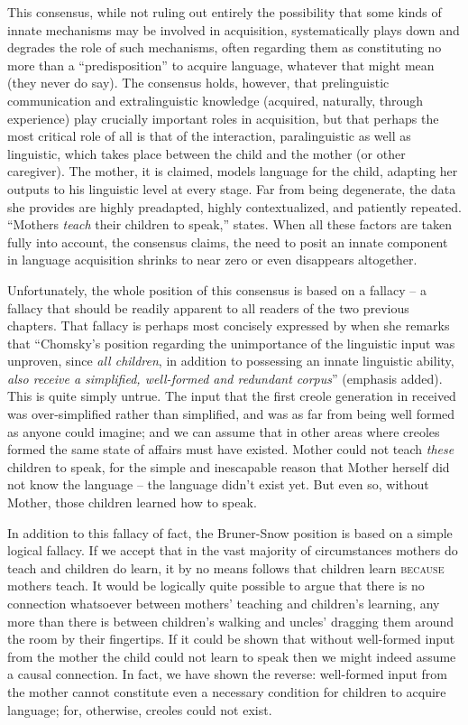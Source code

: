 This consensus, while not ruling out entirely the possibility that some kinds of innate mechanisms may be involved in acquisition, systematically plays down and degrades the role of such mechanisms, often regarding them as constituting no more than a ``predisposition'' to acquire language, whatever that might mean (they never do say). The consensus holds, however, that prelinguistic communication and extralinguistic knowledge (acquired, naturally, through experience) play crucially important roles in acquisition, but that perhaps the most critical role of all is that of the interaction, paralinguistic as well as linguistic, which takes place between the child and the mother (or other caregiver). The mother, it is claimed, models language for the child, adapting her outputs to his linguistic level at every stage. Far from being degenerate, the data she provides are highly preadapted, highly contextualized, and patiently repeated. ``Mothers \textit{teach} their children to speak,'' \citet{Bruner1979} states. When all these factors are taken fully into account, the consensus claims, the need to posit an innate component in language acquisition shrinks to near zero or even disappears altogether.

Unfortunately, the whole position of this consensus is based on a fallacy -- a fallacy that should be readily apparent to all readers of the two previous chapters. That fallacy is perhaps most concisely expressed
by \citet[367]{Snow1979} when she remarks that ``Chomsky's position regarding the unimportance of the linguistic input was unproven, since \textit{all children}, in addition to possessing an innate linguistic ability, \textit{also receive a simplified, well-formed and redundant corpus}'' (emphasis added). This is quite simply untrue. The input that the first creole generation in  received was over-simplified rather than simplified, and was as far from being well formed as anyone could imagine; and we can assume that in other areas where creoles formed the same state of affairs must have existed. Mother could not teach \textit{these} children to speak, for the simple and inescapable reason that Mother herself did not know the language -- the language didn't exist yet. But even so, without Mother, those children learned how to speak.

In addition to this fallacy of fact, the Bruner-Snow position is based on a simple logical fallacy. If we accept that in the vast majority of circumstances mothers do teach and children do learn, it by no means follows that children learn \textsc{because} mothers teach. It would be logically quite possible to argue that there is no connection whatsoever between mothers' teaching and children's learning, any more than there is between children's walking and uncles' dragging them around the room by their fingertips. If it could be shown that without well-formed input from the mother the child could not learn to speak then we might indeed assume a causal connection. In fact, we have shown the reverse: well-formed input from the mother cannot constitute even a necessary condition for children to acquire language; for, otherwise, creoles could not exist.


